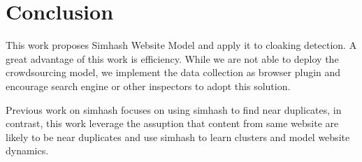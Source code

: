\section{Conclusion}
\label{s:conclusion}

This work proposes Simhash Website Model and apply it to cloaking detection.
A great advantage of this work is efficiency. While we are not able to deploy
the crowdsourcing model, we implement the data collection as browser plugin and
encourage search engine or other inspectors to adopt this solution.

Previous work on simhash focuses on using simhash to find near duplicates, in
contrast, this work leverage the assuption that content from same website are
likely to be near duplicates and use simhash to learn clusters and model website
dynamics.



%
%


